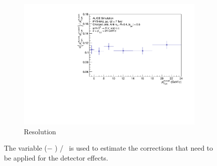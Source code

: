 \begin{figure}[tbh]
\begin{subfigure}{0.49\textwidth}
  \includegraphics[width=1.0\linewidth]{img/HQ16_Simulation_Resolution}
  \caption{Resolution}
  \label{fig:HQ16_Simulation_Resolution}
\end{subfigure}
\caption{The variable (\ptchjetdet $-$ \ptchjetgen) / \ptchjetgen\ is used to estimate the corrections that need to be applied for the detector effects.}
\label{fig:DetectorResponse}
\end{figure}
